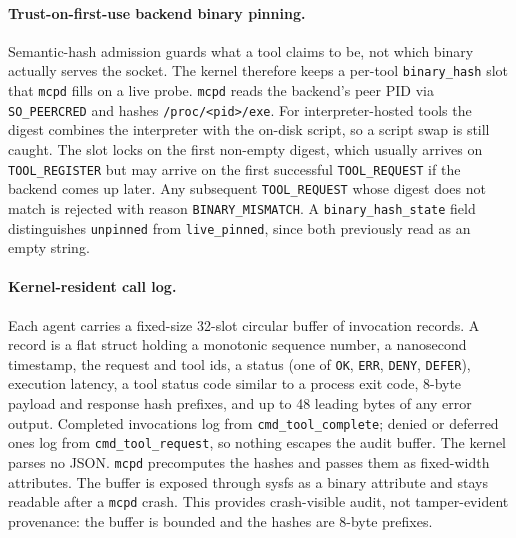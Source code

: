 \paragraph{Trust-on-first-use backend binary pinning.}
Semantic-hash admission guards what a tool claims to be, not which binary actually serves the socket.
The kernel therefore keeps a per-tool \texttt{binary\_\allowbreak hash} slot that \texttt{mcpd} fills on a live probe.
\texttt{mcpd} reads the backend's peer PID via \texttt{SO\_\allowbreak PEERCRED} and hashes \texttt{/\allowbreak proc/\allowbreak <pid>/\allowbreak exe}.
For interpreter-hosted tools the digest combines the interpreter with the on-disk script, so a script swap is still caught.
The slot locks on the first non-empty digest, which usually arrives on \texttt{TOOL\_\allowbreak REGISTER} but may arrive on the first successful \texttt{TOOL\_\allowbreak REQUEST} if the backend comes up later.
Any subsequent \texttt{TOOL\_\allowbreak REQUEST} whose digest does not match is rejected with reason \texttt{BINARY\_\allowbreak MISMATCH}.
A \texttt{binary\_\allowbreak hash\_\allowbreak state} field distinguishes \texttt{unpinned} from \texttt{live\_\allowbreak pinned}, since both previously read as an empty string.

\paragraph{Kernel-resident call log.}
Each agent carries a fixed-size 32-slot circular buffer of invocation records.
A record is a flat struct holding a monotonic sequence number, a nanosecond timestamp, the request and tool ids, a status (one of \texttt{OK}, \texttt{ERR}, \texttt{DENY}, \texttt{DEFER}), execution latency, a tool status code similar to a process exit code, 8-byte payload and response hash prefixes, and up to 48 leading bytes of any error output.
Completed invocations log from \texttt{cmd\_\allowbreak tool\_\allowbreak complete}; denied or deferred ones log from \texttt{cmd\_\allowbreak tool\_\allowbreak request}, so nothing escapes the audit buffer.
The kernel parses no JSON.
\texttt{mcpd} precomputes the hashes and passes them as fixed-width attributes.
The buffer is exposed through sysfs as a binary attribute and stays readable after a \texttt{mcpd} crash.
This provides crash-visible audit, not tamper-evident provenance: the buffer is bounded and the hashes are 8-byte prefixes.

